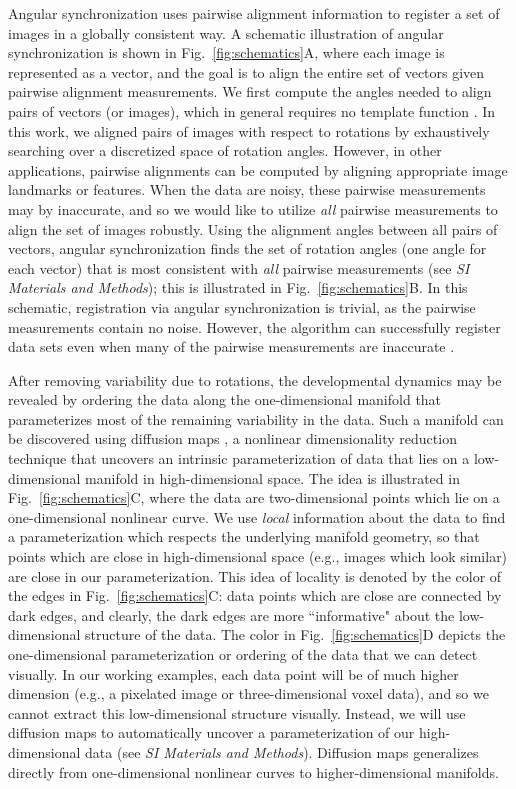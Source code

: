 \documentclass[twocolumn, 10pt]{article}
\newcommand{\SI}[0]{\textit{SI Materials and Methods}}
\newcommand{\fig}[0]{Fig.}
\begin{document}
Angular synchronization uses pairwise alignment information to register a set of images in a globally consistent way.
%
A schematic illustration of angular synchronization is shown in \fig~\ref{fig:schematics}A, where each image is represented as a vector, and the goal is to align the entire set of vectors given pairwise alignment measurements.
%
We first compute the angles needed to align pairs of vectors (or images), which in general requires no template function \citep{ahuja2007template}.
%
In this work, we aligned pairs of images with respect to rotations by exhaustively searching over a discretized space of rotation angles. 
%
However, in other applications, pairwise alignments can be computed by aligning appropriate image landmarks or features. 
%
When the data are noisy, these pairwise measurements may by inaccurate, and so we would like to utilize {\em all} pairwise measurements to align the set of images robustly. 
%
Using the alignment angles between all pairs of vectors, angular synchronization finds the set of rotation angles (one angle for each vector) that is most consistent with {\it all} pairwise measurements (see \SI); this is illustrated in \fig~\ref{fig:schematics}B.
%
In this schematic, registration via angular synchronization is trivial, as the pairwise measurements contain no noise.
%
However, the algorithm can successfully register data sets even when many of the pairwise measurements are inaccurate \citep{singer2011angular}.

After removing variability due to rotations, the developmental dynamics may be revealed by ordering the data along the one-dimensional manifold that parameterizes most of the remaining variability in the data.
%
Such a manifold can be discovered using diffusion maps \citep{coifman2005geometric}, a nonlinear dimensionality reduction technique that uncovers an intrinsic parameterization of data that lies on a low-dimensional manifold in high-dimensional space.
%
The idea is illustrated in \fig~\ref{fig:schematics}C, where the data are two-dimensional points which lie on a one-dimensional nonlinear curve.
%
We use {\it local} information about the data to find a parameterization which respects the underlying manifold geometry, so that points which are close in high-dimensional space (e.g., images which look similar) are close in our parameterization.
%
This idea of locality is denoted by the color of the edges in \fig~\ref{fig:schematics}C:
data points which are close are connected by dark edges, and clearly, the dark edges are more ``informative" about the low-dimensional structure of the data.
%
The color in \fig~\ref{fig:schematics}D depicts the one-dimensional parameterization or ordering of the data that we can detect visually.
%
In our working examples, each data point will be of much higher dimension (e.g., a pixelated image or three-dimensional voxel data), and so we cannot extract this low-dimensional structure visually.
%
Instead, we will use diffusion maps to automatically uncover a parameterization of our high-dimensional data (see \SI).
%
Diffusion maps generalizes directly from one-dimensional nonlinear curves to higher-dimensional manifolds.
\end{document}
